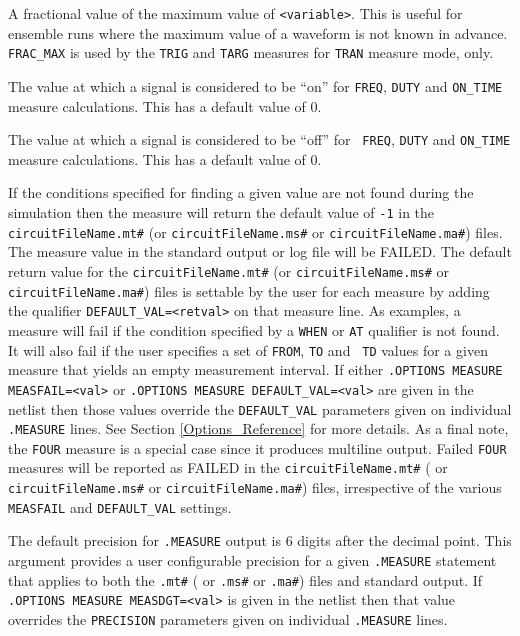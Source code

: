 \begin{Command}
\begin{Arguments}

A fractional value of the maximum value of \texttt{<variable>}.  This
is useful for ensemble runs where the maximum value of a waveform is
not known in advance.  {\tt FRAC\_MAX} is used by the {\tt TRIG} and
{\tt TARG} measures for {\tt TRAN} measure mode, only.


The value at which a signal is considered to be ``on'' for {\tt FREQ},
{\tt DUTY} and {\tt ON\_TIME} measure calculations.  This has a
default value of 0.


The value at which a signal is considered to be ``off'' for {\tt
FREQ}, {\tt DUTY} and {\tt ON\_TIME} measure calculations.  This has a
default value of 0.


If the conditions specified for finding a given value are not found
during the simulation then the measure will return the default value
of {\tt -1} in the \texttt{circuitFileName.mt\#}
(or \texttt{circuitFileName.ms\#} or \texttt{circuitFileName.ma\#})
files.  The measure value in the standard output or log file will be
FAILED.  The default return value for
the \texttt{circuitFileName.mt\#} (or \texttt{circuitFileName.ms\#}
or \texttt{circuitFileName.ma\#}) files is settable by the user for
each measure by adding the qualifier {\tt DEFAULT\_VAL=<retval>} on
that measure line.  As examples, a measure will fail if the condition
specified by a {\tt WHEN} or {\tt AT} qualifier is not found.  It will
also fail if the user specifies a set of {\tt FROM}, {\tt TO} and {\tt
TD} values for a given measure that yields an empty measurement
interval.  If either \texttt{.OPTIONS MEASURE MEASFAIL=<val>}
or \texttt{.OPTIONS MEASURE DEFAULT\_VAL=<val>} are given in the
netlist then those values override the \texttt{DEFAULT\_VAL}
parameters given on individual \texttt{.MEASURE} lines.  See Section
\ref{Options_Reference} for more details.  As a final note, the \texttt{FOUR}
measure is a special case since it produces multiline output.  Failed
\texttt{FOUR} measures will be reported as FAILED in the
\texttt{circuitFileName.mt\#} ( or \texttt{circuitFileName.ms\#} or
\texttt{circuitFileName.ma\#}) files, irrespective of the various
\texttt{MEASFAIL} and \texttt{DEFAULT\_VAL} settings.


The default precision for {\tt .MEASURE} output is 6 digits after the
decimal point.  This argument provides a user configurable precision
for a given {\tt .MEASURE} statement that applies to both
the \texttt{.mt\#} ( or \texttt{.ms\#} or \texttt{.ma\#}) files and
standard output.  If \texttt{.OPTIONS MEASURE MEASDGT=<val>} is given
in the netlist then that value overrides the \texttt{PRECISION}
parameters given on individual \texttt{.MEASURE} lines.


\end{Arguments}
\end{Command}
